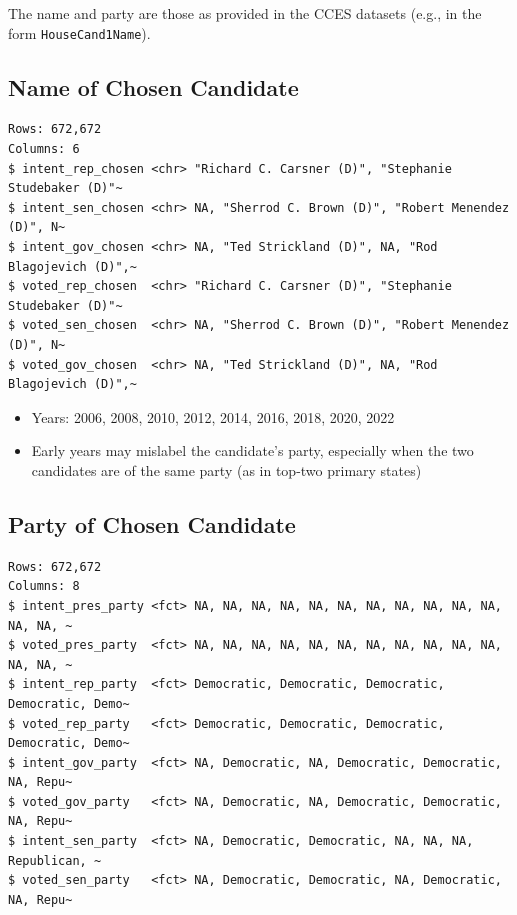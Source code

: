 \documentclass[10pt,article,oneside]{memoir}
\theoremstyle{definition}
\begin{document}
The name and party are those as provided in the CCES datasets (e.g., in
the form \texttt{HouseCand1Name}).

\subsection{Name of Chosen Candidate}\label{name-of-chosen-candidate}

\begin{verbatim}
Rows: 672,672
Columns: 6
$ intent_rep_chosen <chr> "Richard C. Carsner (D)", "Stephanie Studebaker (D)"~
$ intent_sen_chosen <chr> NA, "Sherrod C. Brown (D)", "Robert Menendez (D)", N~
$ intent_gov_chosen <chr> NA, "Ted Strickland (D)", NA, "Rod Blagojevich (D)",~
$ voted_rep_chosen  <chr> "Richard C. Carsner (D)", "Stephanie Studebaker (D)"~
$ voted_sen_chosen  <chr> NA, "Sherrod C. Brown (D)", "Robert Menendez (D)", N~
$ voted_gov_chosen  <chr> NA, "Ted Strickland (D)", NA, "Rod Blagojevich (D)",~
\end{verbatim}

\begin{itemize}
\tightlist
\item
  Years: 2006, 2008, 2010, 2012, 2014, 2016, 2018, 2020, 2022
\item
  Early years may mislabel the candidate's party, especially when the
  two candidates are of the same party (as in top-two primary states)
\end{itemize}

\subsection{Party of Chosen Candidate}\label{party-of-chosen-candidate}

\begin{verbatim}
Rows: 672,672
Columns: 8
$ intent_pres_party <fct> NA, NA, NA, NA, NA, NA, NA, NA, NA, NA, NA, NA, NA, ~
$ voted_pres_party  <fct> NA, NA, NA, NA, NA, NA, NA, NA, NA, NA, NA, NA, NA, ~
$ intent_rep_party  <fct> Democratic, Democratic, Democratic, Democratic, Demo~
$ voted_rep_party   <fct> Democratic, Democratic, Democratic, Democratic, Demo~
$ intent_gov_party  <fct> NA, Democratic, NA, Democratic, Democratic, NA, Repu~
$ voted_gov_party   <fct> NA, Democratic, NA, Democratic, Democratic, NA, Repu~
$ intent_sen_party  <fct> NA, Democratic, Democratic, NA, NA, NA, Republican, ~
$ voted_sen_party   <fct> NA, Democratic, Democratic, NA, Democratic, NA, Repu~
\end{verbatim}
\end{document}
